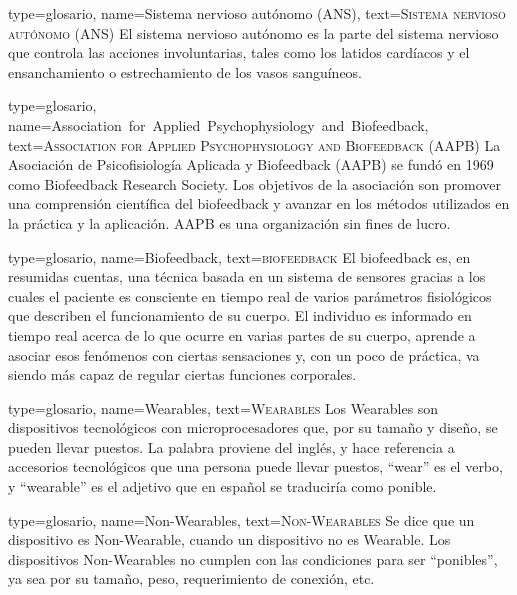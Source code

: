 
{
type={glosario},
name={Sistema nervioso aut\'onomo (ANS)},
text={\textsc{Sistema nervioso aut\'onomo (ANS)}}
}
{ El sistema nervioso autónomo es la parte del sistema nervioso que controla las acciones involuntarias, tales como los latidos cardíacos y el ensanchamiento o estrechamiento de los vasos sanguíneos.
}

{
type={glosario},
name={Association~for~Applied~Psychophysiology~and~Biofeedback},
text={\textsc{Association for Applied Psychophysiology and Biofeedback (AAPB)}}
}
{ 
La Asociación de Psicofisiología Aplicada y Biofeedback (AAPB) se fundó en 1969 como Biofeedback Research Society. Los objetivos de la asociación son promover una comprensión científica del biofeedback y avanzar en los métodos utilizados en la práctica y la aplicación. AAPB es una organización sin fines de lucro.
}

{
type={glosario},
name={Biofeedback},
text={\textsc{biofeedback}}
}
{ El biofeedback es, en resumidas cuentas, una técnica basada en un sistema de sensores gracias a los cuales el paciente es consciente en tiempo real de varios parámetros fisiológicos que describen el funcionamiento de su cuerpo. El individuo es informado en tiempo real acerca de lo que ocurre en varias partes de su cuerpo, aprende a asociar esos fenómenos con ciertas sensaciones y, con un poco de práctica, va siendo más capaz de regular ciertas funciones corporales.
}


{
type={glosario},
name={Wearables},
text={\textsc{Wearables}}
}
{ Los Wearables son dispositivos tecnológicos con microprocesadores que, por su tamaño y diseño, se pueden llevar puestos. La palabra proviene del inglés, y hace referencia a accesorios tecnológicos que una persona puede llevar puestos, ``wear'' es el verbo, y ``wearable'' es el adjetivo que en español se traduciría como ponible.
}

{
type={glosario},
name={Non-Wearables},
text={\textsc{Non-Wearables}}
}
{ Se dice que un dispositivo es Non-Wearable, cuando un dispositivo no es Wearable. Los dispositivos Non-Wearables no cumplen con las condiciones para ser ``ponibles'', ya sea por su tamaño, peso, requerimiento de conexión, etc.
}

